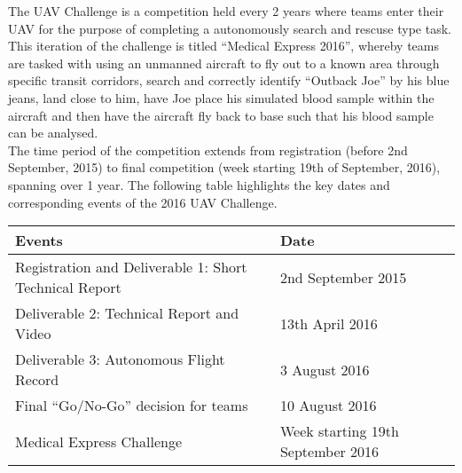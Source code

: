 The UAV Challenge is a competition held every 2 years where teams enter their UAV for the purpose of completing a autonomously search and rescuse type task.
This iteration of the challenge is titled ``Medical Express 2016'', whereby teams are tasked with using an unmanned aircraft to fly out to a known area through specific transit corridors, search and correctly identify ``Outback Joe'' by his blue jeans, land close to him, have Joe place his simulated blood sample within the aircraft and then have the aircraft fly back to base such that his blood sample can be analysed.\\

The time period of the competition extends from registration (before 2nd September, 2015) to final competition (week starting 19th of September, 2016), spanning over 1 year. The following table highlights the key dates and corresponding events of the 2016 UAV Challenge.\\

\begin{center}
	\begin{tabular}{ | l | l | }
	\hline
	Events & Date \\ \hline \hline
	Registration and Deliverable 1: Short Technical Report & 2nd September 2015 \\ \hline
	Deliverable 2: Technical Report and Video & 13th April 2016 \\ \hline
	Deliverable 3: Autonomous Flight Record & 3 August 2016 \\ \hline
	Final ``Go/No-Go'' decision for teams & 10 August 2016 \\ \hline
	Medical Express Challenge & Week starting 19th September 2016 \\
	\hline
	\end{tabular}
\end{center}
